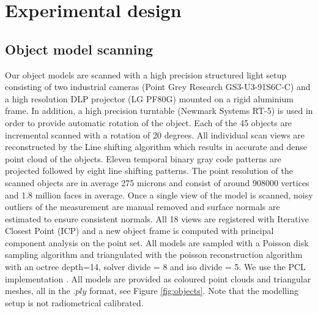 \documentclass[10pt,twocolumn,letterpaper]{article}
\begin{document}
\section{Experimental design} \label{sec:exp_design}
\subsection{Object model scanning}
Our object models are scanned with a high precision structured light setup consisting of two industrial cameras (Point Grey Research GS3-U3-91S6C-C) and
a high resolution DLP projector (LG PF80G) mounted on a rigid aluminium frame. In addition, a high precision turntable (Newmark Systems RT-5) is used in order to provide automatic rotation of the object. Each of the 45 objects are incremental scanned with a rotation of 20 degrees. All individual scan views are reconstructed by the Line shifting algorithm \cite{Guehring2000} which results in accurate and dense point cloud of the objects. Eleven temporal binary gray code patterns are projected followed by eight line shifting patterns. The point resolution of the scanned objects are in average 275 microns and consist of around 908000 vertices and 1.8 million faces in average. Once a single view of the model is scanned, noisy outliers of the measurement are manual removed and surface normals are estimated to ensure consistent normals. All 18 views are registered with Iterative Closest Point (ICP) and a new object frame is computed with principal component analysis on the point set.
All models are sampled with a Poisson disk sampling algorithm \cite{Corsini2012} and triangulated with the poisson reconstruction algorithm \cite{Kazhdan2006} with an octree depth=14, solver divide = 8 and iso divide = 5. We use the PCL implementation \cite{RusuCousins2011}. All models are provided as coloured point clouds and triangular meshes, all in the $.ply$ format, see Figure \ref{fig:objects}. Note that the modelling setup is not radiometrical calibrated.
\end{document}
